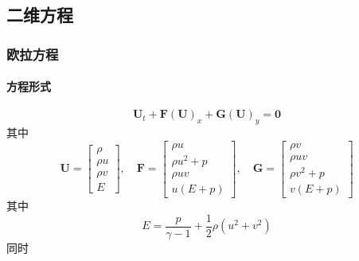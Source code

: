 \documentclass{book}
\begin{document}
\subsection{二维方程}
\subsubsection{欧拉方程}
\paragraph{方程形式}
\begin{equation}
    \mathbf{U}_{t}+\mathbf{F}(\mathbf{U})_{x}+\mathbf{G}(\mathbf{U})_{y}=\mathbf{0}
\end{equation}
其中
\begin{equation}
    \mathbf{U}=\left[\begin{array}{c}
            \rho   \\
            \rho u \\
            \rho v \\
            E
        \end{array}\right], \quad \mathbf{F}=\left[\begin{array}{c}
            \rho u       \\
            \rho u^{2}+p \\
            \rho u v     \\
            u(E+p)
        \end{array}\right], \quad \mathbf{G}=\left[\begin{array}{c}
            \rho v       \\
            \rho u v     \\
            \rho v^{2}+p \\
            v(E+p)
        \end{array}\right]
\end{equation}
其中
\begin{equation}
    E=\dfrac{p}{\gamma-1}+\dfrac{1}{2} \rho\left(u^{2}+v^{2}\right)
\end{equation}
同时
\end{document}

